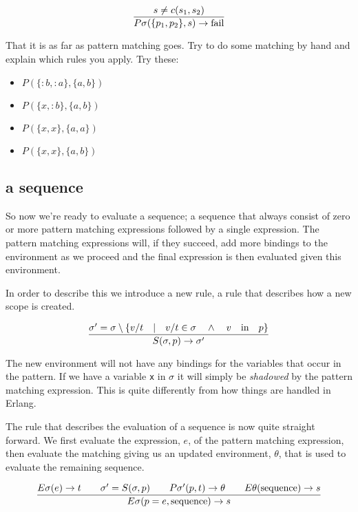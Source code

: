\documentclass[a4paper,11pt]{article}
\begin{document}
$$\frac{s \not = c(s_1, s_2)}{P\sigma(\lbrace p_1, p_2 \rbrace, s) \rightarrow {\rm fail}}$$

That it is as far as pattern matching goes. Try to do some matching by
hand and explain which rules you apply. Try these:

\begin{itemize}
  
\item $P{}(\lbrace :b, :a \rbrace, \lbrace a, b \rbrace)$  
\item $P{}(\lbrace x, :b \rbrace, \lbrace a, b \rbrace)$
\item $P{}(\lbrace x, x \rbrace, \lbrace a, a \rbrace)$
\item $P{}(\lbrace x, x \rbrace, \lbrace a, b \rbrace)$
\end{itemize}


\subsection{a sequence}

So now we're ready to evaluate a sequence; a sequence that always
consist of zero or more pattern matching expressions followed by a
single expression. The pattern matching expressions will, if they
succeed, add more bindings to the environment as we proceed and the
final expression is then evaluated given this environment.

In order to describe this we introduce a new rule, a rule that
describes how a new scope is created.

$$\frac{\sigma' = \sigma \setminus \lbrace v/t \quad | \quad v/t \in \sigma \quad \wedge \quad  v \quad {\rm in} \quad p\rbrace}{S(\sigma, p) \rightarrow \sigma'}$$

The new environment will not have any bindings for the variables that
occur in the pattern. If we have a variable {\tt x} in $\sigma$ it
will simply be {\em shadowed} by the pattern matching expression.
This is quite differently from how things are handled in 
Erlang.

The rule that describes the evaluation of a sequence is now quite
straight forward. We first evaluate the expression, $e$, of the
pattern matching expression, then evaluate the matching giving us an
updated environment, $\theta$, that is used to evaluate the remaining
sequence. 

$$\frac{   
  E\sigma(e) \rightarrow t
  \qquad \sigma' = S(\sigma, p)
  \qquad P\sigma'(p, t) \rightarrow \theta
  \qquad E\theta({\rm sequence}) \rightarrow s
}{E\sigma(p = e, {\rm sequence}) \rightarrow s}$$ 
\end{document}
